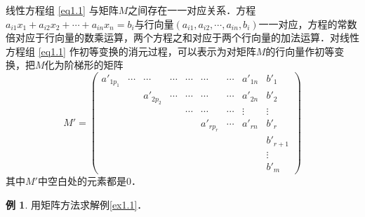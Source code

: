 \documentclass[a4paper,fontset=windows]{ctexbook}
\theoremstyle{definition}
\newtheorem{example}{例}[chapter]
\begin{document}
线性方程组 \eqref{eq1.1} 与矩阵$M$之间存在一一对应关系．方程$a_{i1}x_1+a_{i2}x_2+\cdots+a_{in}x_n=b_i$与行向量$(a_{i1},a_{i2},\cdots,a_{in},b_i)$一一对应，方程的常数倍对应于行向量的数乘运算，两个方程之和对应于两个行向量的加法运算．对线性方程组 \eqref{eq1.1} 作初等变换的消元过程，可以表示为对矩阵$M$的行向量作初等变换，把$M$化为阶梯形的矩阵
$$M'=\begin{pmatrix}a'_{1p_1}&\cdots&\cdots&\cdots&\cdots&\cdots&\cdots&a'_{1n}&b'_1 \\ &&a'_{2p_2}&\cdots&\cdots&\cdots&\cdots&a'_{2n}&b'_2 \\ &&&&\cdots&\cdots&\cdots&\vdots&\vdots \\ &&&&&a'_{rp_r}&\cdots&a'_{rn}&b'_r \\ &&&&&&&&b'_{r+1} \\ &&&&&&&&\vdots \\ &&&&&&&&b'_m\end{pmatrix}$$
其中$M'$中空白处的元素都是0．

\begin{example}
用矩阵方法求解例\ref{ex1.1}．
\end{example}
\end{document}
